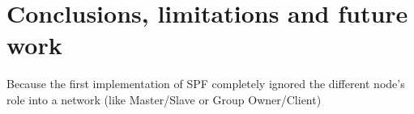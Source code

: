 \chapter{Conclusions, limitations and future work}
\label{conclusion}
\thispagestyle{empty}

Because the first implementation of SPF completely ignored the different node's role into a network (like Master/Slave or Group Owner/Client) 